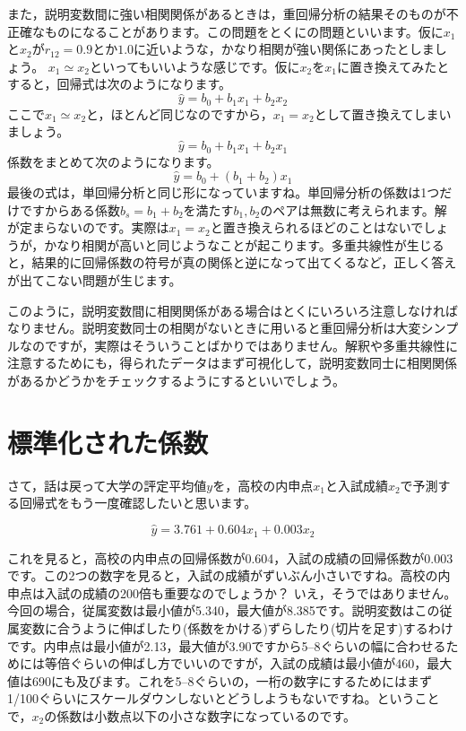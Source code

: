 \documentclass{ltjbook}
\begin{document}
また，説明変数間に強い相関関係があるときは，重回帰分析の結果そのものが不正確なものになることがあります。この問題をとくにの問題といいます。仮に$x_1$と$x_2$が$r_{12}=0.9$とか$1.0$に近いような，かなり相関が強い関係にあったとしましょう。
$x_1 \simeq x_2$といってもいいような感じです。仮に$x_2$を$x_1$に置き換えてみたとすると，回帰式は次のようになります。
\[ \hat{y} = b_0 + b_1 x_1 + b_2x_2 \]
ここで$x_1 \simeq x_2$と，ほとんど同じなのですから，$x_1=x_2$として置き換えてしまいましょう。
\[ \hat{y} = b_0 + b_1 x_1 + b_2x_1 \]
係数をまとめて次のようになります。
\[ \hat{y} = b_0 + (b_1+b_2) x_1 \]
最後の式は，単回帰分析と同じ形になっていますね。単回帰分析の係数は1つだけですからある係数$b_s = b_1 + b_2$を満たす$b_1,b_2$のペアは無数に考えられます。解が定まらないのです。実際は$x_1=x_2$と置き換えられるほどのことはないでしょうが，かなり相関が高いと同じようなことが起こります。多重共線性が生じると，結果的に回帰係数の符号が真の関係と逆になって出てくるなど，正しく答えが出てこない問題が生じます。

このように，説明変数間に相関関係がある場合はとくにいろいろ注意しなければなりません。説明変数同士の相関がないときに用いると重回帰分析は大変シンプルなのですが，実際はそういうことばかりではありません。解釈や多重共線性に注意するためにも，得られたデータはまず可視化して，説明変数同士に相関関係があるかどうかをチェックするようにするといいでしょう。


\section{標準化された係数}

さて，話は戻って大学の評定平均値$y$を，高校の内申点$x_1$と入試成績$x_2$で予測する回帰式をもう一度確認したいと思います。

\[ \hat{y} = 3.761+0.604x_1+0.003x_2 \]

これを見ると，高校の内申点の回帰係数が0.604，入試の成績の回帰係数が0.003です。この2つの数字を見ると，入試の成績がずいぶん小さいですね。高校の内申点は入試の成績の200倍も重要なのでしょうか？ いえ，そうではありません。今回の場合，従属変数は最小値が5.340，最大値が8.385です。説明変数はこの従属変数に合うように伸ばしたり(係数をかける)ずらしたり(切片を足す)するわけです。内申点は最小値が2.13，最大値が3.90ですから5--8ぐらいの幅に合わせるためには等倍ぐらいの伸ばし方でいいのですが，入試の成績は最小値が460，最大値は690にも及びます。これを5--8ぐらいの，一桁の数字にするためにはまず1/100ぐらいにスケールダウンしないとどうしようもないですね。ということで，$x_2$の係数は小数点以下の小さな数字になっているのです。
\end{document}

